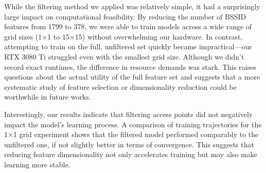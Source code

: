 \documentclass[conference]{IEEEtran}
\begin{document}
	While the filtering method we applied was relatively simple, it had a surprisingly large impact on computational feasibility. By reducing the number of BSSID features from 1799 to 378, we were able to train models across a wide range of grid sizes (1×1 to 15×15) without overwhelming our hardware. In contrast, attempting to train on the full, unfiltered set quickly became impractical—our RTX 3080 Ti struggled even with the smallest grid size. Although we didn’t record exact runtimes, the difference in resource demands was stark. This raises questions about the actual utility of the full feature set and suggests that a more systematic study of feature selection or dimensionality reduction could be worthwhile in future works.
	
	Interestingly, our results indicate that filtering access points did not negatively impact the model's learning process. A comparison of training trajectories for the 1×1 grid experiment shows that the filtered model performed comparably to the unfiltered one, if not slightly better in terms of convergence. This suggests that reducing feature dimensionality not only accelerates training but may also make learning more stable.
	
\end{document}
